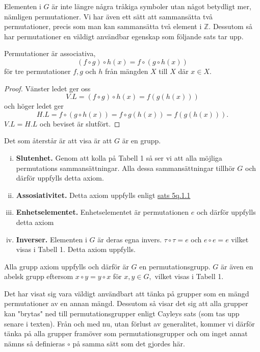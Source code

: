 \documentclass{article}
\theoremstyle{definition}
\begin{document}
Elementen i $G$ är inte längre några tråkiga symboler utan något betydligt mer, nämligen permutationer. 
Vi har även ett sätt att sammansätta två permutationer, precis som man kan sammansätta två element
i $\mathbb{Z}.$ Dessutom så har permutationer en väldigt användbar egenskap som följande sats 
tar upp. 
\hypertarget{ass}{}
\begin{mytheo}{}{}
  Permutationer är associativa,
  \[(f \circ g) \circ h(x) = f \circ (g \circ h(x))\]
  för tre permutationer $f, g$ och $h$ från mängden $X$ till $X$ där $x \in X.$
\end{mytheo}
\begin{proof}
  Vänster ledet ger oss 
  \[V.L = (f \circ g) \circ h(x) = f(g(h(x)))\]
  och höger ledet ger 
  \[H.L = f \circ (g \circ h(x)) = f \circ g(h(x)) = f(g(h(x))).\]
  $V.L = H.L$ och beviset är slutfört.
\end{proof}

Det som återstår är att visa är att $G$ är en grupp. 
\begin{enumerate}[(i)]
  \item \textbf{Slutenhet.} Genom att kolla på Tabell 1 så ser vi att alla möjliga permutations
  sammansättningar. Alla dessa sammansättningar tillhör $G$ och därför uppfylls detta axiom.
  \item \textbf{Assosiativitet.} Detta axiom uppfylls enligt \hyperlink{ass}{sats 5q.1.1}
  \item \textbf{Enhetselementet.} Enhetselementet är 
  permutationen $e$ och därför uppfylls detta axiom
  \item \textbf{Inverser.} Elementen i $G$ är deras egna invers. $\tau \circ \tau = e$ och 
  $e \circ e = e$ vilket visas i Tabell 1. Detta axiom uppfylls.
\end{enumerate}
Alla grupp axiom uppfylls och därför är $G$ en permutationsgrupp. $G$ är även en abelsk grupp 
eftersom $x \circ y = y \circ x$ för $x, y \in G,$ vilket visas i Tabell 1.

Det har visat sig vara väldigt användbart att tänka på grupper som en mängd permutationer av en 
annan mängd. Dessutom så visar det sig att alla grupper kan "brytas" ned till permutationsgrupper
enligt Cayleys sats (som tas upp senare i texten).
Från och med nu, utan förlust av generalitet, kommer vi därför tänka på alla grupper framöver
som permutationsgrupper och om inget annat nämns så definieras $\circ$ på samma sätt som det 
gjordes här.
\end{document}

